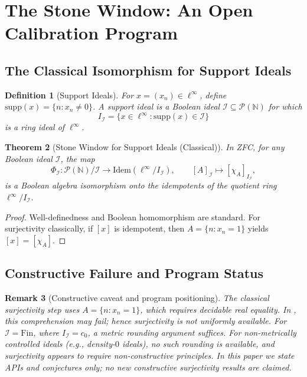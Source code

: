\documentclass[11pt]{article}
\newtheorem{theorem}{Theorem}[section]
\newtheorem{definition}[theorem]{Definition}
\newtheorem{remark}[theorem]{Remark}
\newcommand{\N}{\mathbb{N}}
\newcommand{\BISH}{\mathrm{BISH}}
\newcommand{\linf}{\ell^\infty}
\newcommand{\czero}{c_0}
\newcommand{\supp}{\mathrm{supp}}
\newcommand{\Idem}{\mathrm{Idem}}
\begin{document}
\section{The Stone Window: An Open Calibration Program}

\subsection{The Classical Isomorphism for Support Ideals}

\begin{definition}[Support Ideals]
For $x=(x_n)\in \linf$, define $\supp(x)=\{n : x_n\neq 0\}$. A \emph{support ideal} is a Boolean ideal $\mathcal{I}\subseteq \mathcal{P}(\N)$ for which
\[
I_{\mathcal{I}}=\{x\in \linf : \supp(x)\in \mathcal{I}\}
\]
is a ring ideal of $\linf$.
\end{definition}

\begin{theorem}[Stone Window for Support Ideals (Classical)]\label{thm:stone-general-classical}
In ZFC, for any Boolean ideal $\mathcal{I}$, the map
\[
\Phi_{\mathcal{I}} : \mathcal{P}(\N)/\mathcal{I}\to \Idem(\linf/I_{\mathcal{I}}),\qquad [A]_{\mathcal{I}}\mapsto [\chi_A]_{I_{\mathcal{I}}},
\]
is a Boolean algebra isomorphism onto the idempotents of the quotient ring $\linf/I_{\mathcal{I}}$.
\end{theorem}
\begin{proof}
Well-definedness and Boolean homomorphism are standard. For surjectivity classically, if $[x]$ is idempotent, then $A=\{n:x_n=1\}$ yields $[x]=[\chi_A]$.
\end{proof}

\subsection{Constructive Failure and Program Status}

\begin{remark}[Constructive caveat and program positioning]\label{rem:constructive-caveat}
The classical surjectivity step uses $A=\{n:x_n=1\}$, which requires decidable real equality. In \BISH, this comprehension may fail; hence surjectivity is not uniformly available. For $\mathcal{I}=\mathrm{Fin}$, where $I_{\mathcal{I}}=\czero$, a metric rounding argument suffices. For non-metrically controlled ideals (e.g., density-$0$ ideals), no such rounding is available, and surjectivity appears to require non-constructive principles. 
\emph{In this paper we state APIs and conjectures only; no new constructive surjectivity results are claimed.}
\end{remark}
\end{document}
